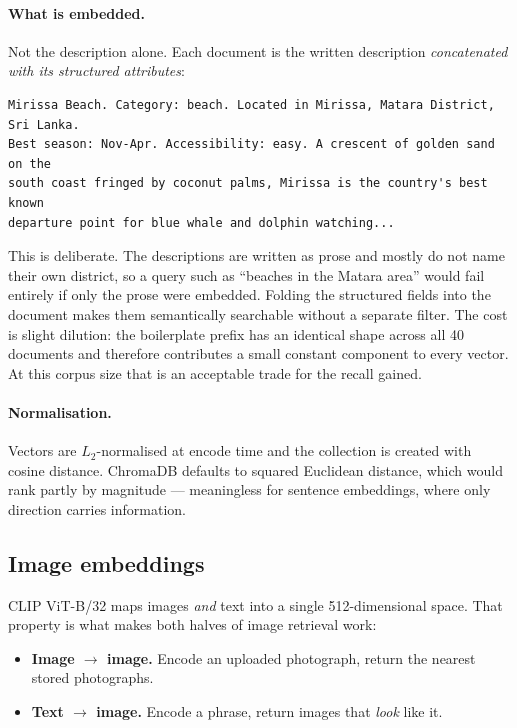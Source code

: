 \documentclass[11pt,a4paper]{article}
\begin{document}
\paragraph{What is embedded.} Not the description alone. Each document is the
written description \emph{concatenated with its structured attributes}:

\begin{lstlisting}[caption={The embedded document for one attraction.}]
Mirissa Beach. Category: beach. Located in Mirissa, Matara District, Sri Lanka.
Best season: Nov-Apr. Accessibility: easy. A crescent of golden sand on the
south coast fringed by coconut palms, Mirissa is the country's best known
departure point for blue whale and dolphin watching...
\end{lstlisting}

This is deliberate. The descriptions are written as prose and mostly do not name
their own district, so a query such as ``beaches in the Matara area'' would fail
entirely if only the prose were embedded. Folding the structured fields into the
document makes them semantically searchable without a separate filter. The cost
is slight dilution: the boilerplate prefix has an identical shape across all 40
documents and therefore contributes a small constant component to every vector.
At this corpus size that is an acceptable trade for the recall gained.

\paragraph{Normalisation.} Vectors are $L_2$-normalised at encode time and the
collection is created with cosine distance. ChromaDB defaults to squared
Euclidean distance, which would rank partly by magnitude --- meaningless for
sentence embeddings, where only direction carries information.

\subsection{Image embeddings}

CLIP ViT-B/32 maps images \emph{and} text into a single 512-dimensional space.
That property is what makes both halves of image retrieval work:

\begin{itemize}[itemsep=2pt]
  \item \textbf{Image $\rightarrow$ image.} Encode an uploaded photograph, return
        the nearest stored photographs.
  \item \textbf{Text $\rightarrow$ image.} Encode a phrase, return images that
        \emph{look} like it.
\end{itemize}
\end{document}
